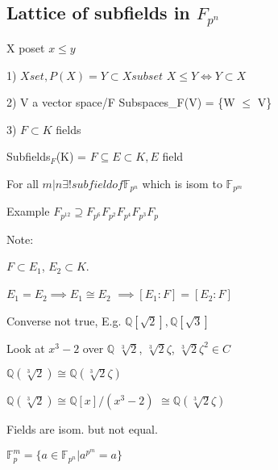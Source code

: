 \documentclass[twoside]{article}
\newcommand{\Q}{\mathbb{Q}}
\newcommand{\F}{\mathbb{F}}
\begin{document}
    \subsection{Lattice of subfields in $F_{p^n}$}

    X poset $x \leq y$



    1) $X set, P(X) = {Y \subset X subset}$ 
   $ X \leq Y \iff Y \subset X$


    2) V a vector space/F 
    Subspaces_F(V) = \{W $\leq$ V\}


    3) $F \subset K$ fields 


    Subfields$_F$(K) = $F \subseteq E \subset K, E$ field 

    For all $m \vert n \exists! subfield of \F_{p^n}$ which is isom to $\F_{p^m}$

    Example $F_{p^12} \supseteq F_{p^6}F_{p^2}F_{p^4}F_{p^3}F_{p}$



    Note: 

    $F \subset E_1$, $E_2 \subset K$. 
    
    $E_1 = E_2 \implies E_1 \cong E_2$
    $ \implies [E_1:F] = [E_2:F]$

    Converse not true, E.g. $\Q[\sqrt 2], \Q[\sqrt 3]$


    \textbullet Look at $x^3 - 2$ over $\Q$
    $\sqrt[3] 2$, $\sqrt[3] 2 \zeta$, $\sqrt[3] 2 \zeta^2 \in C$

    $\Q(\sqrt[3] 2) 
    \cong  \Q(\sqrt[3] 2 \zeta)$

    $\Q(\sqrt[3] 2)  \cong \Q[x]/(x^3 - 2)$
     $ \cong \Q(\sqrt[3] 2 \zeta)$

     Fields are isom. but not equal. 

     $\F_p^m = \{a \in \F_{p^n} \vert a^{p^m}=a\}$
\end{document}
